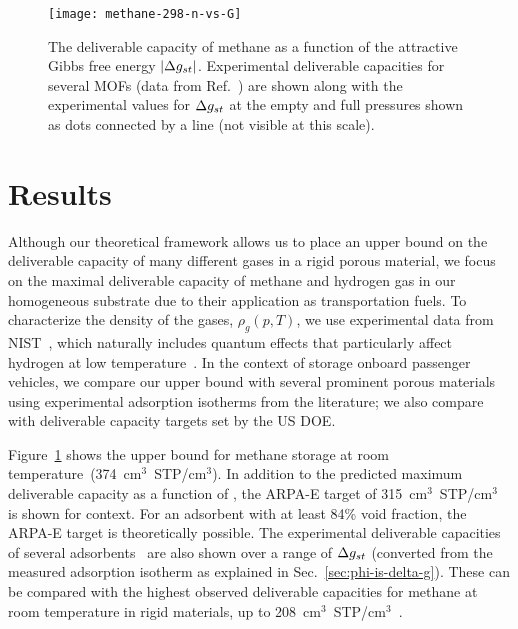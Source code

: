 \begin{figure}
    \centering
    \texttt{[image: methane-298-n-vs-G]}
    \caption{The deliverable capacity of methane as a function of the attractive Gibbs free energy $|\Delta g_{st}|$.
    Experimental deliverable capacities for several MOFs (data from Ref.~\cite{mason2014evaluating, furukawa2009storage}) are shown along with the experimental values for $\Delta g_{st}$ at the empty and full pressures shown as dots connected by a line (not visible at this scale).}
    \label{fig:methane-298-D}
\end{figure}

\section{Results}
Although our theoretical framework allows us to place an upper bound on the deliverable capacity of many different gases in a rigid porous material, we focus on the maximal deliverable capacity of methane and hydrogen gas in our homogeneous substrate due to their application as transportation fuels. To characterize the density of the gases, $\rho_g(p, T)$, we use experimental data from NIST~\cite{nist}, which naturally includes quantum effects that particularly affect hydrogen at low temperature~\cite{kumar2006quantum}. In the context of storage onboard passenger vehicles, we compare our upper bound with several prominent porous materials using experimental adsorption isotherms from the literature; we also compare with deliverable capacity targets set by the US DOE.

Figure~\ref{fig:methane-298-D} shows the upper bound for methane storage at room temperature~(374~cm$^3$~STP/cm$^3$). In addition to the predicted maximum deliverable capacity as a function of \gst,
the ARPA-E target of 315~cm$^3$~STP/cm$^3$~\cite{arpaemove} is shown for context. For an adsorbent with at least 84\% void fraction, the ARPA-E target is theoretically possible. The experimental deliverable capacities of several adsorbents~\cite{mason2014evaluating} are also shown over a range of $\Delta g_{st}$ (converted from the measured adsorption isotherm as explained in  Sec.~\ref{sec:phi-is-delta-g}). These can be compared with the highest observed deliverable capacities for methane at room temperature in rigid materials, up to 208~cm$^3$~STP/cm$^3$~\cite{simon2015materials}. 

